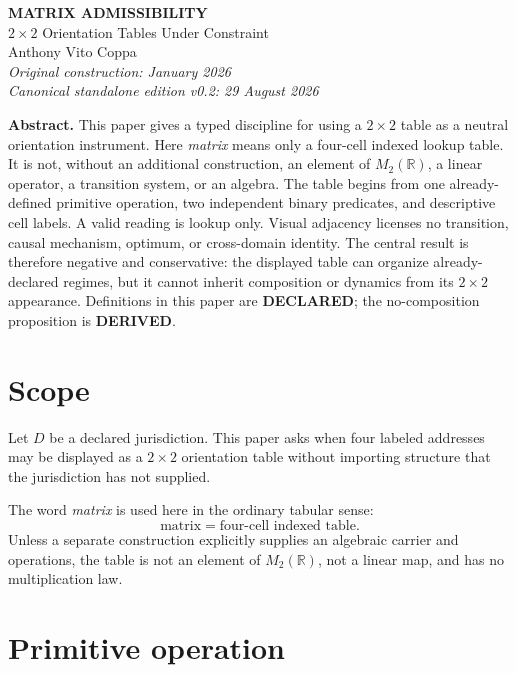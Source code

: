 \documentclass[11pt]{article}
\begin{document}
\begin{center}
{\Large\bfseries MATRIX ADMISSIBILITY}\\[3pt]
{\large $2\times2$ Orientation Tables Under Constraint}\\[8pt]
Anthony Vito Coppa\\[2pt]
\textit{Original construction: January 2026}\\
\textit{Canonical standalone edition v0.2: 29 August 2026}
\end{center}

\begin{lawbox}
\textbf{Abstract.}
This paper gives a typed discipline for using a $2\times2$ table as a neutral orientation instrument. Here \emph{matrix} means only a four-cell indexed lookup table. It is not, without an additional construction, an element of $M_2(\mathbb R)$, a linear operator, a transition system, or an algebra. The table begins from one already-defined primitive operation, two independent binary predicates, and descriptive cell labels. A valid reading is lookup only. Visual adjacency licenses no transition, causal mechanism, optimum, or cross-domain identity. The central result is therefore negative and conservative: the displayed table can organize already-declared regimes, but it cannot inherit composition or dynamics from its $2\times2$ appearance. Definitions in this paper are \textbf{DECLARED}; the no-composition proposition is \textbf{DERIVED}.
\end{lawbox}

\section{Scope}

Let $D$ be a declared jurisdiction. This paper asks when four labeled addresses may be displayed as a $2\times2$ orientation table without importing structure that the jurisdiction has not supplied.

The word \emph{matrix} is used here in the ordinary tabular sense:
\[
\boxed{\text{matrix} = \text{four-cell indexed table}.}
\]
Unless a separate construction explicitly supplies an algebraic carrier and operations, the table is not an element of $M_2(\mathbb R)$, not a linear map, and has no multiplication law.

\section{Primitive operation}
\end{document}
